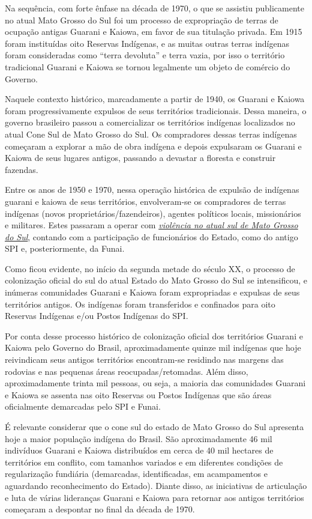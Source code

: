 Na sequência, com forte ênfase na década de 1970, o que se assistiu
publicamente no atual Mato Grosso do Sul foi um processo de expropriação
de terras de ocupação antigas Guarani e Kaiowa, em favor de sua
titulação privada. Em 1915 foram instituídas oito Reservas Indígenas, e
as muitas outras terras indígenas foram consideradas como ``terra
devoluta'' e terra vazia, por isso o território tradicional Guarani e
Kaiowa se tornou legalmente um objeto de comércio do Governo.

Naquele contexto histórico, marcadamente a partir de 1940, os Guarani e
Kaiowa foram progressivamente expulsos de seus territórios tradicionais.
Dessa maneira, o governo brasileiro passou a comercializar os
territórios indígenas localizados no atual Cone Sul de Mato Grosso do
Sul. Os compradores dessas terras indígenas começaram a explorar a mão
de obra indígena e depois expulsaram os Guarani e Kaiowa de seus lugares
antigos, passando a devastar a floresta e construir fazendas.

Entre os anos de 1950 e 1970, nessa operação histórica de expulsão de
indígenas guarani e kaiowa de seus territórios, envolveram-se os
compradores de terras indígenas (novos proprietários/fazendeiros),
agentes políticos locais, missionários e militares. Estes passaram a
operar com
\href{http://www.ihu.unisinos.br/noticias/514921-situacao-de-indios-guarani-kaiowa-e-de-confinamento-reconhece-funai}{\emph{violência
no atual sul de Mato Grosso do Sul}}, contando com a participação de
funcionários do Estado, como do antigo SPI e, posteriormente, da Funai.

Como ficou evidente, no início da segunda metade do século XX, o
processo de colonização oficial do sul do atual Estado do Mato Grosso do
Sul se intensificou, e inúmeras comunidades Guarani e Kaiowa foram
expropriadas e expulsas de seus territórios antigos. Os indígenas foram
transferidos e confinados para oito Reservas Indígenas e/ou Postos
Indígenas do SPI.

Por conta desse processo histórico de colonização oficial dos
territórios Guarani e Kaiowa pelo Governo do Brasil, aproximadamente
quinze mil indígenas que hoje reivindicam seus antigos territórios
encontram-se residindo nas margens das rodovias e nas pequenas áreas
reocupadas/retomadas. Além disso, aproximadamente trinta mil pessoas, ou
seja, a maioria das comunidades Guarani e Kaiowa se assenta nas oito
Reservas ou Postos Indígenas que são áreas oficialmente demarcadas pelo
SPI e Funai.

É relevante considerar que o cone sul do estado de Mato Grosso do Sul
apresenta hoje a maior população indígena do Brasil. São aproximadamente
46 mil indivíduos Guarani e Kaiowa distribuídos em cerca de 40 mil
hectares de territórios em conflito, com tamanhos variados e em
diferentes condições de regularização fundiária (demarcadas,
identificadas, em acampamentos e aguardando reconhecimento do Estado).
Diante disso, as iniciativas de articulação e luta de várias lideranças
Guarani e Kaiowa para retornar aos antigos territórios começaram a
despontar no final da década de 1970.

